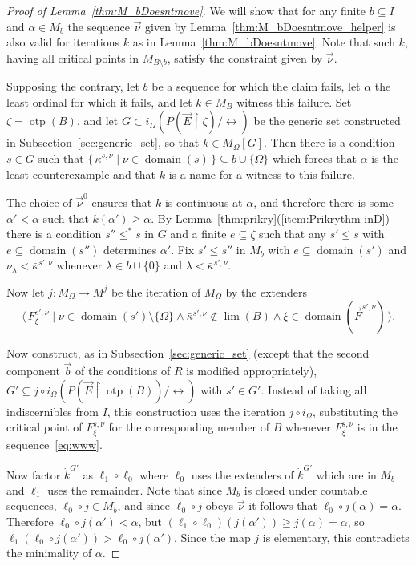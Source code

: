 \documentclass[
twoside,
]{article}
\theoremstyle{definition}
\theoremstyle{remark}
\newcommand{\forceKappa}{\bar\kappa} %
\DeclareMathOperator{\otp}{otp}
\newcommand{\ords}{\Omega}
\newcommand\gkeq{\leftrightarrow}
\newcommand\mgkeq{/{\gkeq}}
\newcommand{\sing}[1]{\{#1\}}
\newcommand{\set}[1]{\{\,#1\,\}}
\newcommand{\pair}[1]{\langle#1\rangle}
\newcommand{\seq}[1]{\pair{\,#1\,}}
\newcommand{\restrict}{{\upharpoonright}}
\DeclareMathOperator{\domain}{domain}
\begin{document}
\begin{proof}[Proof of Lemma~\ref{thm:M_bDoesntmove}]
  We will show that for any finite $b\subseteq I$ and $\alpha\in M_b$
  the sequence $\vec\nu$ given by Lemma~\ref{thm:M_bDoesntmove_helper} is also valid for
  iterations $k$ as in Lemma~\ref{thm:M_bDoesntmove}.  Note that such
  $k$, having all critical points in $M_{B\setminus b}$, satisfy the
  constraint given by  $\vec\nu$.

  Supposing the contrary, let $b$ be a sequence for which the claim
  fails, let
  $\alpha$ the least ordinal for which it fails, and let $k\in M_B$
  witness this failure.
  Set $\zeta=\otp(B)$, and let $G\subset i_{\ords}(P(\vec E\restrict\zeta)\mgkeq)$ 
  be the generic set 
  constructed in Subsection~\ref{sec:generic_set}, so that $k\in
  M_\ords[G]$. 
  Then there is a condition $s\in G$ such that
  $\set{\forceKappa^{s,\nu}\mid\nu\in\domain(s)}\subseteq
  b\cup\sing{\ords}$ which forces that $\alpha$ is the least
  counterexample and that $\dot k$ is a name for a witness to this failure. 
  
  The choice of $\vec\nu^{0}$ ensures that $k$ is continuous at $\alpha$,
  and therefore there is some $\alpha'<\alpha$ such that
  $k(\alpha')\geq\alpha$. 
  By Lemma~\ref{thm:prikry}(\ref{item:Prikrythm-inD}) there is a
  condition $s''\leq^*s$ in $G$ and a finite $e\subseteq\zeta$ such that any
  $s'\leq s$ with $e\subseteq\domain(s'')$  determines 
  $\alpha'$.   Fix $s'\leq s''$ in $M_b$ with $e\subseteq\domain(s')$
  and $\nu_{\lambda}<\forceKappa^{s',\nu}$ whenever $\lambda\in
  b\cup\sing0$ and $\lambda<\forceKappa^{s',\nu}$.

  Now let $ j\colon M_{\ords}\to M^{ j}$ be the iteration of $M_{\ords}$
  by the extenders
  \begin{equation}
    \label{eq:www}
    \seq{F^{s',\nu}_{\xi}\mid\nu\in\domain(s')\setminus\sing\ords\land
      \forceKappa^{s',\nu}\notin\lim(B)
      \land \xi\in\domain(\vec F^{s',\nu})}.
  \end{equation}

  Now  construct, as in
  Subsection~\ref{sec:generic_set} (except that the second component
  $\vec b$ of the conditions 
  of $R$ is modified
  appropriately),  $G'\subseteq  j\circ i_{\ords}(P(\vec 
  E\restrict\otp(B))\mgkeq)$ with $s'\in G'$.      Instead of taking all
  indiscernibles from $I$, this construction uses the iteration
  $j\circ i_{\ords}$, substituting the critical
  point of $F^{s,\nu}_{\xi}$ for the corresponding member of $B$
  whenever $F^{s,\nu}_{\xi}$ is  in the sequence~\eqref{eq:www}.

  Now factor $\dot k^{G'}$ as $\ell_1\circ\ell_0$ where $\ell_0$ uses the
  extenders of $\dot k^{G'}$ which are
  in $M_b$ and $\ell_1$ uses the remainder.
  Note that
  since $M_b$ is closed under countable sequences, $\ell_0\circ j\in
  M_b$, and since $\ell_0\circ j$ obeys $\vec\nu$ it follows that $\ell_0\circ j(\alpha)=\alpha$.    
  Therefore $\ell_0\circ j(\alpha')<\alpha$, but  $(\ell_1\circ
  \ell_0)(j(\alpha'))\geq j(\alpha)=\alpha$, so
  $\ell_1(\ell_0\circ j(\alpha'))>\ell_0\circ j (\alpha')$.    Since the map $j$ is
  elementary, this contradicts the minimality of $\alpha$.  
\end{proof}
\end{document}
